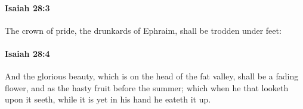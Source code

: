 		\paragraph{Isaiah 28:3} %
			\label{ISAIAH-28-3}

			The crown of pride, the drunkards of Ephraim, shall be trodden under feet:


		\paragraph{Isaiah 28:4} %
			\label{ISAIAH-28-4}

			And the glorious beauty, which is on the head of the fat valley, shall be a fading flower, and as the hasty fruit before the summer; which when he that looketh upon it seeth, while it is yet in his hand he eateth it up.


